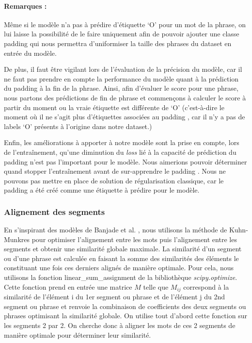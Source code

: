 \documentclass[a4paper, twoside, 11pt]{article}
\begin{document}
 \paragraph{Remarques :}
 Même si le modèle n’a pas à prédire d’étiquette ‘O’ pour un mot de la phrase, on lui laisse la possibilité de le faire uniquement afin de pouvoir ajouter une classe \og padding \fg{} qui nous permettra d’uniformiser la taille des phrases du dataset en entrée du modèle.

De plus, il faut être vigilant lors de l’évaluation de la précision du modèle, car il ne faut pas prendre en compte la performance du modèle quant à la prédiction du \og padding \fg{} à la fin de la phrase. Ainsi, afin d’évaluer le score pour une phrase, nous partons des prédictions de fin de phrase et commençons à calculer le score à partir du moment ou la vraie étiquette est différente de ‘O’ (c'est-à-dire le moment où il ne s’agit plus d'étiquettes associées au \og padding \fg{}, car il n’y a pas de labels ‘O’ présents à l’origine dans notre dataset.)

Enfin, les améliorations à apporter à notre modèle sont la prise en compte, lors de l’entraînement, qu’une diminution du \textit{loss} lié à la capacité de prédiction du \og padding \fg{} n’est pas l’important pour le modèle. Nous aimerions pouvoir déterminer quand stopper l’entraînement avant de sur-apprendre le \og padding \fg{}. Nous ne pouvons pas mettre en place de solution de régularisation classique, car le \og padding \fg{} a été créé comme une étiquette à prédire pour le modèle.

\subsubsection{Alignement des segments}

En s’inspirant des modèles de Banjade et al. \cite{banjade}  \cite{banjadeautre}, nous utilisons la méthode de Kuhn-Munkres pour optimiser l’alignement entre les mots puis l’alignement entre les segments et obtenir une similarité globale maximale. La similarité d’un segment ou d’une phrase est calculée en faisant la somme des similarités des éléments le constituant une fois ces derniers alignés de manière optimale. Pour cela, nous utilisons la fonction \og linear\_sum\_assignment \fg{} de la bibliothèque \textit{scipy.optimize}. Cette fonction prend en entrée une matrice $M$ telle que $M_{ij}$ correspond à la similarité de l’élément i du 1er segment ou phrase et de l’élément j du 2nd segment ou phrase et renvoie la combinaison de coefficients des deux segments ou phrases optimisant la similarité globale. On utilise tout d’abord cette fonction sur les segments 2 par 2. On cherche donc à aligner les mots de ces 2 segments de manière optimale pour déterminer leur similarité.
\end{document}

